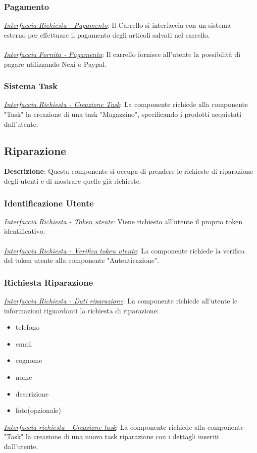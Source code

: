 \documentclass{report}
\begin{document}
\subsubsection*{\indent \indent Pagamento}
\uline{\textit{Interfaccia Richiesta - Pagamento}}:
Il Carrello si interfaccia con un sistema esterno per effettuare il pagamento degli articoli salvati nel carrello.\\\\
\uline{\textit{Interfaccia Fornita - Pagamento}}:
Il carrello fornisce all'utente la possibilità di pagare utilizzando Nexi o Paypal.
\subsubsection*{\indent \indent Sistema Task}
\uline{\textit{Interfaccia Richiesta - Creazione Task}}:
La componente richiede alla componente "Task" la creazione di una task "Magazzino", specificando i prodotti acquistati dall'utente.
\subsection*{Riparazione}
\textbf{Descrizione}: Questa componente si occupa di prendere le richieste di riparazione degli utenti e di mostrare quelle già richieste.
\subsubsection*{\indent \indent Identificazione Utente}
\textcolor{Auth}{\uline{\textit{Interfaccia Richiesta - Token utente}}}: 
Viene richiesto all'utente il proprio token identificativo.\\\\
\textcolor{Auth}{\uline{\textit{Interfaccia Richiesta - Verifica token utente}}}:
La componente richiede la verifica del token utente alla componente "Autenticazione".
\subsubsection*{\indent \indent Richiesta Riparazione}
\uline{\textit{Interfaccia Richiesta - Dati riparazione}}:
La componente richiede all'utente le informazioni riguardanti la richiesta di riparazione:
\begin{itemize}
	\item telefono
	\item email
	\item cognome
	\item nome
	\item descrizione
	\item foto(opzionale)
\end{itemize}
\uline{\textit{Interfaccia richiesta - Creazione task}}: 
La componente richiede alla componente "Task" la creazione di una nuova task riparazione con i dettagli inseriti dall'utente.
\end{document}
